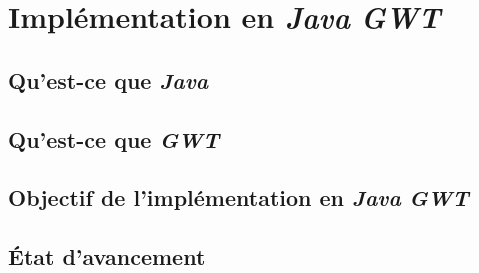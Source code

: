 \section{Implémentation en \emph{Java} \emph{GWT}}
  \subsection{Qu'est-ce que \emph{Java}}
  \subsection{Qu'est-ce que \emph{GWT}}
  \subsection{Objectif de l'implémentation en \emph{Java} \emph{GWT}}
  \subsection{État d'avancement}

